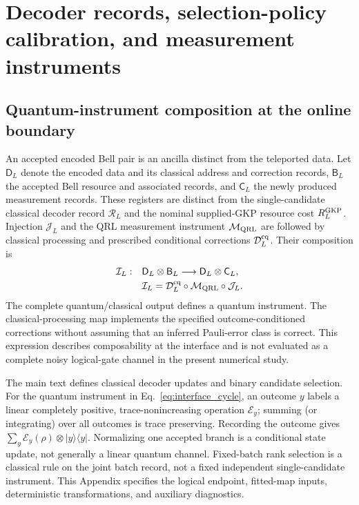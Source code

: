 \documentclass[aps,
prx,
superscriptaddress,
reprint,
longbibliography,
floatfix]{revtex4-2}
\begin{document}
\section{Decoder records, selection-policy calibration, and measurement instruments}\label{app:decoder_details}
\subsection{Quantum-instrument composition at the online boundary}\label{app:instrument_composition}
An accepted encoded Bell pair is an ancilla distinct from the teleported data. Let $\mathsf D_L$ denote the encoded data and its classical address and correction records, $\mathsf B_L$ the accepted Bell resource and associated records, and $\mathsf C_L$ the newly produced measurement records. These registers are distinct from the single-candidate classical decoder record $\mathcal R_L$ and the nominal supplied-GKP resource cost $R_L^{\rm GKP}$. Injection $\mathcal J_L$ and the QRL measurement instrument $\mathcal M_{\rm QRL}$ are followed by classical processing and prescribed conditional corrections $\mathcal D_L^{\rm cq}$. Their composition is
\begin{equation}
\begin{aligned}
\mathcal I_L:&\quad \mathsf D_L\otimes \mathsf B_L
\longrightarrow \mathsf D_L\otimes\mathsf C_L,\\
&\quad\mathcal I_L=\mathcal D_L^{\rm cq}\circ\mathcal M_{\rm QRL}\circ\mathcal J_L.
\end{aligned}
\label{eq:interface_cycle}
\end{equation}
The complete quantum/classical output defines a quantum instrument. The classical-processing map implements the specified outcome-conditioned corrections without assuming that an inferred Pauli-error class is correct. This expression describes composability at the interface and is not evaluated as a complete noisy logical-gate channel in the present numerical study.

The main text defines classical decoder updates and binary candidate selection. For the quantum instrument in Eq.~\eqref{eq:interface_cycle}, an outcome $y$ labels a linear completely positive, trace-nonincreasing operation $\mathcal E_y$; summing (or integrating) over all outcomes is trace preserving. Recording the outcome gives $\sum_y\mathcal E_y(\rho)\otimes|y\rangle\langle y|$. Normalizing one accepted branch is a conditional state update, not generally a linear quantum channel. Fixed-batch rank selection is a classical rule on the joint batch record, not a fixed independent single-candidate instrument. This Appendix specifies the logical endpoint, fitted-map inputs, deterministic transformations, and auxiliary diagnostics.
\end{document}
